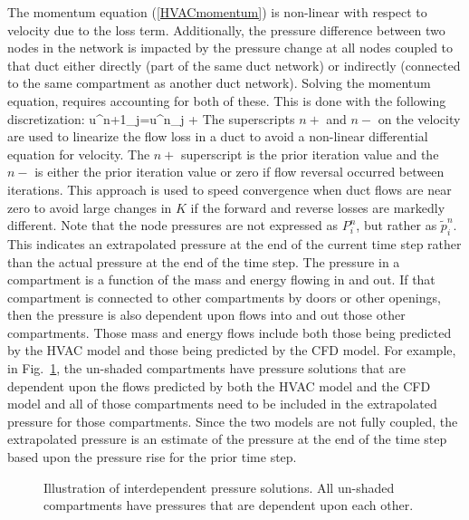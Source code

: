 The momentum equation (\ref{HVACmomentum}) is non-linear with respect to velocity due to
the loss term.  Additionally, the pressure difference between two nodes in the network is impacted by the pressure change at all
nodes coupled to that duct either directly (part of the same duct network) or indirectly (connected to the same compartment as another duct network).
Solving the momentum equation, requires accounting for both of these.  This is done with the following discretization:
\be u^{n+1}_j=u^{n}_j +   \label{HVACdiscretemomentum} \ee
The superscripts $n+$ and $n-$ on the velocity are used to linearize the flow loss in a duct to avoid a non-linear differential equation for velocity.
The $n+$ superscript is the prior iteration value and the $n-$ is either the prior iteration value or zero if flow reversal occurred between iterations.
This approach is used to speed convergence when duct flows are near zero to avoid large changes in $K$ if the forward and reverse losses are markedly different.
Note that the node pressures are not expressed as $P^n_i$, but rather as $\tilde{p}^n_i$.  This indicates an extrapolated pressure at the end of the current time step
rather than the actual pressure at the end of the time step.  The pressure in a compartment is a function of the mass and energy flowing in and out.
If that compartment is connected to other compartments by doors or other openings, then the pressure is also dependent upon flows into and out those other compartments.
Those mass and energy flows include both those being predicted by the HVAC model and those being predicted by the CFD model.
For example, in Fig.~\ref{hvacpressure}, the un-shaded compartments have pressure solutions that are dependent upon the flows predicted by both the
HVAC model and the CFD model and all of those compartments need to be included in the extrapolated pressure for those compartments.
Since the two models are not fully coupled, the extrapolated pressure is an estimate of the pressure at the end of the time step based upon the pressure rise for the prior time step.

\begin{figure}[ht!]
   \begin{center}
      \caption[Illustration of interdependent pressure solutions]{\label{hvacpressure} Illustration of interdependent pressure solutions.  All un-shaded compartments have pressures that are dependent upon each other.}
   \end{center}
\end{figure}

